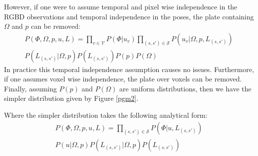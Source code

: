 However, if one were to assume temporal and pixel wise independence in the RGBD observations and temporal independence in 
the poses, the plate containing $\Omega$ and $p$ can be removed:
\begin{equation}
\begin{split}
P(\Phi, \Omega, p, u, L) = 
\prod_{v \in \mathcal{V}}P(\Phi|u_{v})
\prod_{(s, s') \in \mathcal{S}}P(u_{v}|\Omega, p, L_{(s, s')}) \\
P(L_{(s, s')}|\Omega, p) P(L_{(s, s')})P(p)P(\Omega)
\end{split}
\end{equation}
In practice this temporal independence assumption causes no issues. Furthermore, if one assumes voxel wise independence, the plate over voxels can be removed. Finally, assuming $P(p)$ and 
$P(\Omega)$ are uniform distributions, then we have the simpler distribution given by Figure \ref{pgm2}.

Where the simpler distribution takes the following analytical form:
\begin{equation}
\begin{split}
P(\Phi, \Omega, p, u, L) = 
\prod_{(s, s') \in \mathcal{S}} P(\Phi|u, L_{(s, s')}) \\
P(u|\Omega, p)
P(L_{(s, s')}|\Omega, p)
P(L_{(s, s')})
\end{split}
\end{equation}

